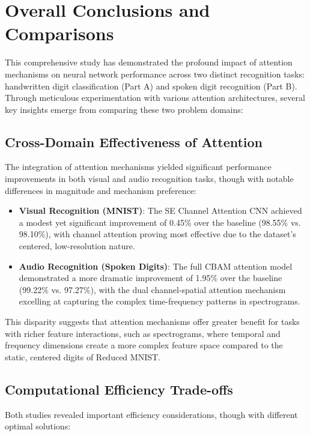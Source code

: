 \documentclass[12pt]{article}
\begin{document}
\section{Overall Conclusions and Comparisons}

This comprehensive study has demonstrated the profound impact of attention mechanisms on neural network performance across two distinct recognition tasks: handwritten digit classification (Part A) and spoken digit recognition (Part B). Through meticulous experimentation with various attention architectures, several key insights emerge from comparing these two problem domains:

\subsection{Cross-Domain Effectiveness of Attention}

The integration of attention mechanisms yielded significant performance improvements in both visual and audio recognition tasks, though with notable differences in magnitude and mechanism preference:

\begin{itemize}
    \item \textbf{Visual Recognition (MNIST)}: The SE Channel Attention CNN achieved a modest yet significant improvement of 0.45\% over the baseline (98.55\% vs. 98.10\%), with channel attention proving most effective due to the dataset's centered, low-resolution nature.
    
    \item \textbf{Audio Recognition (Spoken Digits)}: The full CBAM attention model demonstrated a more dramatic improvement of 1.95\% over the baseline (99.22\% vs. 97.27\%), with the dual channel-spatial attention mechanism excelling at capturing the complex time-frequency patterns in spectrograms.\\
\end{itemize}
This disparity suggests that attention mechanisms offer greater benefit for tasks with richer feature interactions, such as spectrograms, where temporal and frequency dimensions create a more complex feature space compared to the static, centered digits of Reduced MNIST.

\subsection{Computational Efficiency Trade-offs}

Both studies revealed important efficiency considerations, though with different optimal solutions:
\end{document}
